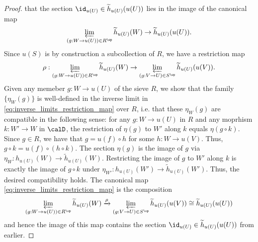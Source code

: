 \begin{proof}
    that the section $\id_{u(U)} \in \widetilde{h}_{u(U)}(u(U))$ lies in the image of the canonical map
    \begin{equation} \label{eq:inverse_limits_restriction_map}
    \varprojlim_{(g: W \to u(U)) \in R^{\op}} \widetilde{h}_{u(U)}(W) \to \widetilde{h}_{u(U)}(u(U)).
    \end{equation}
    Since $u(S)$ is by construction a subcollection of $R$, we have a restriction map
    $$\rho: \varprojlim_{(g: W \to u(U)) \in R^{\op}} \widetilde{h}_{u(U)}(W) \to \varprojlim_{(g: V \to U) \in S^{\op}} \widetilde{h}_{u(U)}(u(V)).$$
    Given any memeber $g: W \to u(U)$ of the sieve $R$, we show that the family $\{\eta_{W}(g)\}$ is well-defined in the inverse limit in \eqref{eq:inverse_limits_restriction_map} over $R$, i.e. that these $\eta_W(g)$ are compatible in the following sense: for any $g: W \to u(U)$ in $R$ and any moprhism $k: W' \to W$ in $\calD$, the restriction of $\eta(g)$ to $W'$ along $k$ equals $\eta(g \circ k)$. Since $g \in R$, we have that $g = u(f) \circ h$ for some $h: W \to u(V)$. Thus, $g \circ k = u(f) \circ (h \circ k)$. The section $\eta(g)$ is the image of $g$ via $\eta_W: h_{u(U)}(W) \to \widetilde{h}_{u(U)}(W)$. Restricting the image of $g$ to $W'$ along $k$ is exactly the image of $g \circ k$ under $\eta_{W'}: h_{u(U)}(W') \to \widetilde{h}_{u(U)}(W')$. Thus, the desired compatibility holds. The canonical map \eqref{eq:inverse_limits_restriction_map} is the composition
    $$\varprojlim_{(g: W \to u(U)) \in R^{\op}} \widetilde{h}_{u(U)}(W) \xrightarrow{\rho} \varprojlim_{(g: V \to U) \in S^{\op}} \widetilde{h}_{u(U)}(u(V)) \cong \widetilde{h}_{u(U)}(u(U))$$
    and hence the image of this map contains the section $\id_{u(U)} \in \widetilde{h}_{u(U)}(u(U))$ from earlier.
\end{proof}
